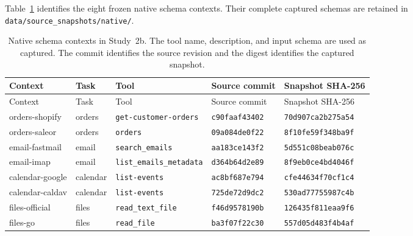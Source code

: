 Table~\ref{tab:exp25-sources} identifies the eight frozen native schema contexts. Their complete captured schemas are retained in \texttt{data/source\_snapshots/native/}.
\begin{center}\scriptsize\setlength{\tabcolsep}{3pt}\begin{longtable}{@{}lllll@{}}
\caption{Native schema contexts in Study~2b. The tool name, description, and input schema are used as captured. The commit identifies the source revision and the digest identifies the captured snapshot.}\label{tab:exp25-sources}\\
\toprule
Context & Task & Tool & Source commit & Snapshot SHA-256 \\\midrule
\endfirsthead\toprule
Context & Task & Tool & Source commit & Snapshot SHA-256 \\\midrule\endhead
orders-shopify & orders & \texttt{get-customer-orders} & \texttt{c90faaf43402} & \texttt{70d907ca2b275a54} \\
orders-saleor & orders & \texttt{orders} & \texttt{09a084de0f22} & \texttt{8f10fe59f348ba9f} \\
email-fastmail & email & \texttt{search\_emails} & \texttt{aa183ce143f2} & \texttt{5d551c08beab076c} \\
email-imap & email & \texttt{list\_emails\_metadata} & \texttt{d364b64d2e89} & \texttt{8f9eb0ce4bd4046f} \\
calendar-google & calendar & \texttt{list-events} & \texttt{ac8bf687e794} & \texttt{cfe44634f70cf1c4} \\
calendar-caldav & calendar & \texttt{list-events} & \texttt{725de72d9dc2} & \texttt{530ad77755987c4b} \\
files-official & files & \texttt{read\_text\_file} & \texttt{f46d9578190b} & \texttt{126435f811eaa9f6} \\
files-go & files & \texttt{read\_file} & \texttt{ba3f07f22c30} & \texttt{557d05d483f4b4af} \\
\bottomrule
\end{longtable}\end{center}
